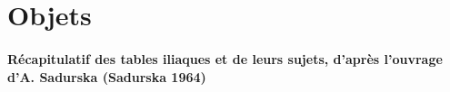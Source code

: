 \documentclass[14pt]{these}
\begin{document}
\part{Objets}
\newcommand{\objet}[2][]{
  {
    \setkeys{bdd}{#1}
    \centering\noindent\texttt{[image: \#2]}

    \vfill
    \textbf{Dénomination:} \BDDname\\ 
    \textbf{Sujet:} \BDDsubject\\ 
    \textbf{Matériau:} \BDDmaterial\\
    \textbf{Datation:} \BDDdate\\ 
    \textbf{Artiste:} \BDDartist\\ 
    \textbf{Lieu de découverte:} \BDDdiscovery\\ 
    \textbf{Localisation actuelle:} \BDDlocation\\ 
    \textbf{Crédits photographiques:} \BDDcredits

    \vspace{2\onelineskip}
  }

  \clearpage
}


\subsection*{Récapitulatif des tables iliaques et de leurs sujets, d'après l'ouvrage
d'A. Sadurska (Sadurska 1964)}
\end{document}

